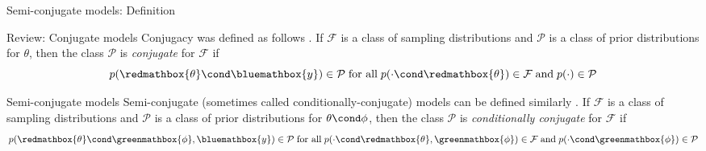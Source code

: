 \documentclass[10pt]{beamer}
\begin{document}
\begin{frame}{Semi-conjugate models: Definition}

\begin{sblock}{Review: Conjugate models}
Conjugacy was defined as follows \cite{gelman2013bayesian}. If $\mathcal{F}$ is a class of sampling distributions and $\mathcal{P}$ is a class of prior distributions for $\theta$, then the class $\mathcal{P}$ is \textit{conjugate} for $\mathcal{F}$ if
\[  p(\redmathbox{\theta} \cond \bluemathbox{y} ) \in \mathcal{P} \; \text{for all} \; p(\cdot \cond \redmathbox{\theta}) \in \mathcal{F} \; \text{and} \; p(\cdot) \in \mathcal{P} \]
\end{sblock}

\begin{sblock}{Semi-conjugate models}
Semi-conjugate (sometimes called conditionally-conjugate) models can be defined similarly  \cite{gelman2013bayesian}.  If $\mathcal{F}$ is a class of sampling distributions and $\mathcal{P}$ is a class of prior distributions for $\theta \cond \phi$, then the class $\mathcal{P}$ is \textit{conditionally conjugate} for $\mathcal{F}$ if
\[  p(\redmathbox{\theta} \cond \greenmathbox{\phi}, \bluemathbox{y}) \in \mathcal{P} \; \text{for all} \; p(\cdot \cond \redmathbox{\theta}, \greenmathbox{\phi}) \in \mathcal{F} \; \text{and} \; p(\cdot \cond \greenmathbox{\phi}) \in \mathcal{P} \]
\end{sblock}
\end{frame}
\end{document}
